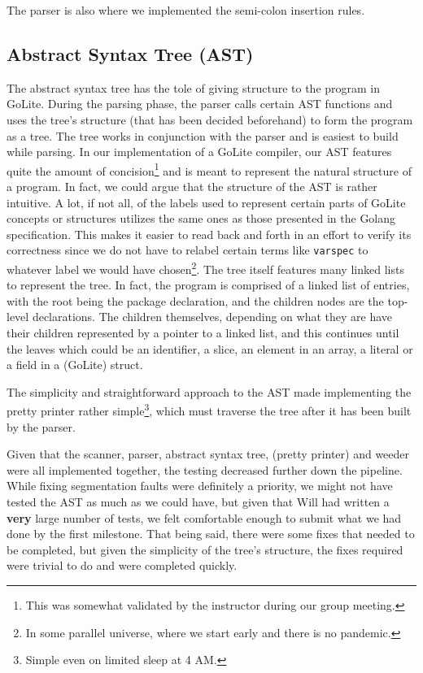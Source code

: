 \documentclass{article}
\begin{document}
The parser is also where we implemented the semi-colon insertion rules. 

\subsection{Abstract Syntax Tree (AST)}


The abstract syntax tree has the tole of giving structure to the program in GoLite. During the parsing phase, the parser calls certain AST functions and uses the tree's structure (that has been decided beforehand) to form the program as a tree. The tree works in conjunction with the parser and is easiest to build while parsing. In our implementation of a GoLite compiler, our AST features quite the amount of concision\footnote{This was somewhat validated by the instructor during our group meeting.} and is meant to represent the natural structure of a program. In fact, we could argue that the structure of the AST is rather intuitive. A lot, if not all, of the labels used to represent certain parts of GoLite concepts or structures utilizes the same ones as those presented in the Golang specification\cite{gospec}. This makes it easier to read back and forth in an effort to verify its correctness since we do not have to relabel certain terms like \texttt{varspec} to whatever label we would have chosen\footnote{In some parallel universe, where we start early and there is no pandemic.}. The tree itself features many linked lists to represent the tree. In fact, the program is comprised of a linked list of entries, with the root being the package declaration, and the children nodes are the top-level declarations. The children themselves, depending on what they are have their children represented by a pointer to a linked list, and this continues until the leaves which could be an identifier, a slice, an element in an array, a literal or a field in a (GoLite) struct.

The simplicity and straightforward approach to the AST made implementing the pretty printer rather simple\footnote{Simple even on limited sleep at 4 AM.}, which must traverse the tree after it has been built by the parser.


Given that the scanner, parser, abstract syntax tree, (pretty printer) and weeder were all implemented together, the testing decreased further down the pipeline. While fixing segmentation faults were definitely a priority, we might not have tested the AST as much as we could have, but given that Will had written a \textbf{very} large number of tests, we felt comfortable enough to submit what we had done by the first milestone. That being said, there were some fixes that needed to be completed, but given the simplicity of the tree's structure, the fixes required were trivial to do and were completed quickly.
\end{document}
